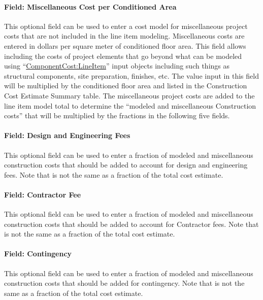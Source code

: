 \paragraph{Field: Miscellaneous Cost per Conditioned Area}\label{field-miscellaneous-cost-per-conditioned-area}

This optional field can be used to enter a cost model for miscellaneous project costs that are not included in the line item modeling. Miscellaneous costs are entered in dollars per square meter of conditioned floor area. This field allows including the costs of project elements that go beyond what can be modeled using ``\hyperref[componentcostlineitem]{ComponentCost:LineItem}'' input objects including such things as structural components, site preparation, finishes, etc. The value input in this field will be multiplied by the conditioned floor area and listed in the Construction Cost Estimate Summary table. The miscellaneous project costs are added to the line item model total to determine the ``modeled and miscellaneous Construction costs'' that will be multiplied by the fractions in the following five fields.

\paragraph{Field: Design and Engineering Fees}\label{field-design-and-engineering-fees}

This optional field can be used to enter a fraction of modeled and miscellaneous construction costs that should be added to account for design and engineering fees. Note that is not the same as a fraction of the total cost estimate.

\paragraph{Field: Contractor Fee}\label{field-contractor-fee}

This optional field can be used to enter a fraction of modeled and miscellaneous construction costs that should be added to account for Contractor fees. Note that is not the same as a fraction of the total cost estimate.

\paragraph{Field: Contingency}\label{field-contingency}

This optional field can be used to enter a fraction of modeled and miscellaneous construction costs that should be added for contingency. Note that is not the same as a fraction of the total cost estimate.

